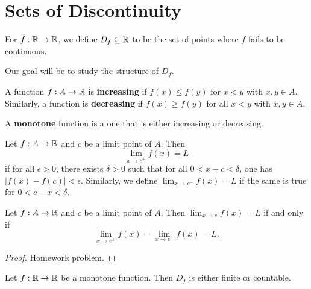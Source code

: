 \section{Sets of Discontinuity}

\begin{definition}
  For $f : \mathbb{R} \to \mathbb{R}$, we define $D_f \subseteq \mathbb{R}$
  to be the set of points where $f$ fails to be
  continuous.
\end{definition}

Our goal will be to study the structure of $D_f$.

\begin{definition}
  A function $f : A \to \mathbb{R}$ is \textbf{increasing}
  if $f(x) \le f(y)$ for
  $x < y$ with $x, y \in A$.
  Similarly, a function is \textbf{decreasing} if
  $f(x) \ge f(y)$
  for all $x < y$ with $x, y \in A$.
\end{definition}

\begin{definition}
  A \textbf{monotone} function is a one that is
  either increasing or decreasing.
\end{definition}

\begin{definition}
  Let $f : A \to \mathbb{R}$ and $c$ be a limit point of $A$.
  Then
  \[\lim_{x \to c^+} f(x) = L\]
  if for all $\epsilon > 0$, there exists $\delta > 0$
  such that for all $0 < x - c < \delta$, one has
  $|f(x) - f(c)| < \epsilon$. Similarly,
  we define
  $\lim_{x \to c^-} f(x) = L$
  if the same is true for $0 < c - x < \delta$.
\end{definition}

\begin{theorem}
  Let $f : A \to \mathbb{R}$ and $c$ be a limit point of $A$.
  Then $\lim_{x \to c} f(x) = L$ if and only if
  \[\lim_{x \to c^+} f(x) = \lim_{x \to c^-} f(x) = L.\]
\end{theorem}

\begin{proof}
  Homework problem.
\end{proof}

\begin{theorem}
  Let $f : \mathbb{R} \to \mathbb{R}$ be a monotone function. Then
  $D_f$ is either finite or countable.
\end{theorem}

